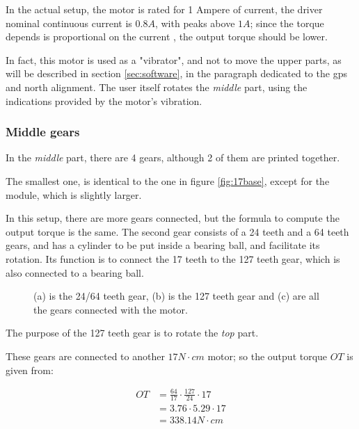 \documentclass[]{article}
\newcommand{\inctrimpic}[2][1]
{\texttt{[image: \#2]}}
\begin{document}
In the actual setup, the motor is rated for 1 Ampere of current, the driver nominal continuous current is $0.8A$, with peaks above $1A$; since the torque depends is proportional on the current \cite{steppermcurrent}, the output torque should be lower. 

In fact, this motor is used as a "vibrator", and not to move the upper parts, as will be described in section \ref{sec:software}, in the paragraph dedicated to the gps and north alignment. The user itself rotates the \textit{middle} part, using the indications provided by the motor's vibration.

\subsubsection{Middle gears}

In the \textit{middle} part, there are 4 gears, although 2 of them are printed together. 

The smallest one, is identical to the one in figure \ref{fig:17base}, except for the module, which is slightly larger. 

In this setup, there are more gears connected, but the formula to compute the output torque is the same. The second gear consists of a 24 teeth and a 64 teeth gears, and has a cylinder to be put inside a bearing ball, and facilitate its rotation. Its function is to connect the 17 teeth to the 127 teeth gear, which is also connected to a bearing ball.

\begin{figure}[h]
	\centering
	\subfigure[]{\inctrimpic[0.45]{images/motors/mot_middle_64_24.pdf}}
	\subfigure[]{\inctrimpic[0.45]{images/motors/mot_middle_127.pdf}
	}		
	
	\subfigure[]{\inctrimpic[0.7]{images/motors/mot_middle.pdf}}
	\caption{(a) is the 24/64 teeth gear, (b) is the 127 teeth gear and (c) are all the gears connected with the motor.}
	\label{fig:middle_gears}
\end{figure}


The purpose of the 127 teeth gear is to rotate the \textit{top} part.

These gears are connected to another $17 N \cdot cm$ motor; so the output torque $OT$ is given from:



\begin{align*}
	OT & = \frac{64}{17}\cdot \frac{127}{24}\cdot 17 \\
	   & = 3.76 \cdot 5.29 \cdot 17\\
	   & = 338.14 N\cdot cm
\end{align*}
\newpage
\end{document}
